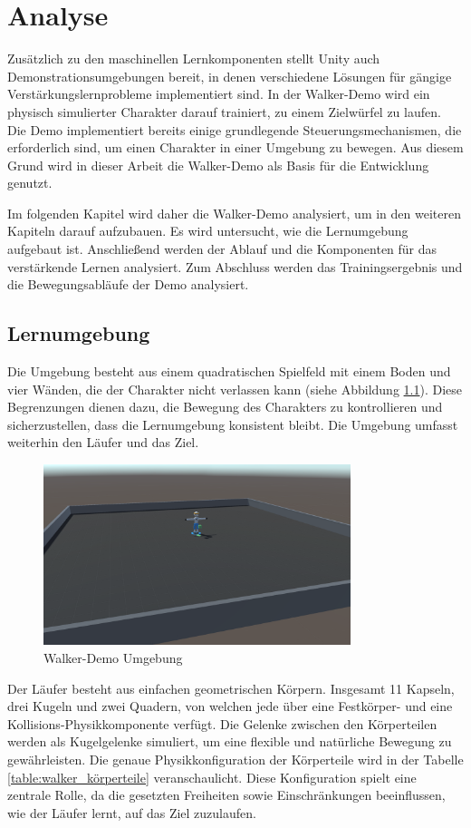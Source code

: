 \chapter{Analyse}
\label{sec:analyse}
Zusätzlich zu den maschinellen Lernkomponenten stellt Unity auch Demonstrationsumgebungen bereit, in denen verschiedene Lösungen für gängige Verstärkungslernprobleme implementiert sind. In der Walker-Demo wird ein physisch simulierter Charakter darauf trainiert, zu einem Zielwürfel zu laufen. Die Demo implementiert bereits einige grundlegende Steuerungsmechanismen, die erforderlich sind, um einen Charakter in einer Umgebung zu bewegen. Aus diesem Grund wird in dieser Arbeit die Walker-Demo als Basis für die Entwicklung genutzt. 

Im folgenden Kapitel wird daher die Walker-Demo analysiert, um in den weiteren Kapiteln darauf aufzubauen. Es wird untersucht, wie die Lernumgebung aufgebaut ist. Anschließend werden der Ablauf und die Komponenten für das verstärkende Lernen analysiert. Zum Abschluss werden das Trainingsergebnis und die Bewegungsabläufe der Demo analysiert.
\section{Lernumgebung}
Die Umgebung besteht aus einem quadratischen Spielfeld mit einem Boden und vier Wänden, die der Charakter nicht verlassen kann (siehe Abbildung \ref{fig:szene_demo}). Diese Begrenzungen dienen dazu, die Bewegung des Charakters zu kontrollieren und sicherzustellen, dass die Lernumgebung konsistent bleibt. Die Umgebung umfasst weiterhin den Läufer und das Ziel.

\begin{figure}[H]
  \centering  
  \includegraphics[width=0.8\textwidth]{img/szene_demo}
  \caption{Walker-Demo Umgebung}
  \label{fig:szene_demo}
\end{figure}

Der Läufer besteht aus einfachen geometrischen Körpern. Insgesamt 11 Kapseln, drei Kugeln und zwei Quadern, von welchen jede über eine Festkörper- und eine Kollisions-Physikkomponente verfügt. Die Gelenke zwischen den Körperteilen werden als Kugelgelenke simuliert, um eine flexible und natürliche Bewegung zu gewährleisten. Die genaue Physikkonfiguration der Körperteile wird in der Tabelle \ref{table:walker_körperteile} veranschaulicht. Diese Konfiguration spielt eine zentrale Rolle, da die gesetzten Freiheiten sowie Einschränkungen beeinflussen, wie der Läufer lernt, auf das Ziel zuzulaufen.

